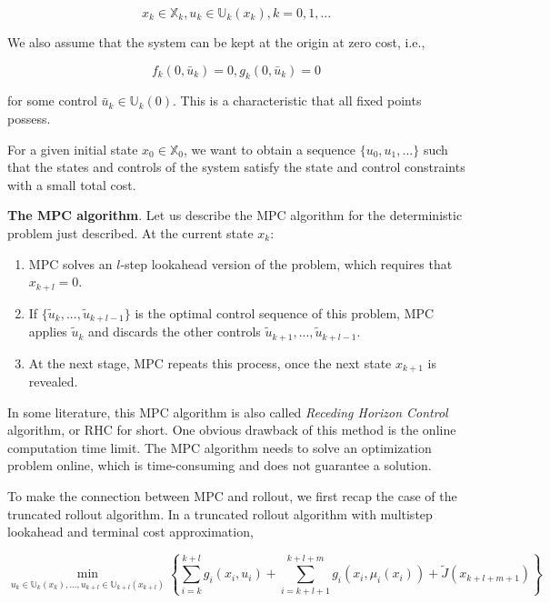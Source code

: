 \documentclass[
]{book}
\theoremstyle{definition}
\theoremstyle{definition}
\theoremstyle{definition}
\theoremstyle{definition}
\theoremstyle{remark}
\begin{document}
\begin{equation}
x_k \in \mathbb X_k, u_k \in \mathbb U_k(x_k), k = 0,1,...
\end{equation}

We also assume that the system can be kept at the origin at zero cost, i.e.,

\begin{equation}
f_k(0,\bar u_k)=0,g_k(0,\bar u_k)=0 
\end{equation}

for some control \(\bar u_k \in \mathbb U_k(0)\). This is a characteristic that all fixed points possess.

For a given initial state \(x_0 \in \mathbb X_0\), we want to obtain a sequence \(\{u_0,u_1,...\}\) such that the states and controls of the system satisfy the state and control constraints with a small total cost.

\textbf{The MPC algorithm}. Let us describe the MPC algorithm for the deterministic problem just described. At the current state \(x_k\):

\begin{enumerate}
\def\labelenumi{\arabic{enumi}.}
\item
  MPC solves an \(l\)-step lookahead version of the problem, which requires that \(x_{k+l}=0\).
\item
  If \(\{\tilde u_k, ..., \tilde u_{k+l-1}\}\) is the optimal control sequence of this problem, MPC applies \(\tilde u_k\) and discards the other controls \(\tilde u_{k+1}, ..., \tilde u_{k+l-1}\).
\item
  At the next stage, MPC repeats this process, once the next state \(x_{k+1}\) is revealed.
\end{enumerate}

In some literature, this MPC algorithm is also called \emph{Receding Horizon Control} algorithm, or RHC for short. One obvious drawback of this method is the online computation time limit. The MPC algorithm needs to solve an optimization problem online, which is time-consuming and does not guarantee a solution.

To make the connection between MPC and rollout, we first recap the case of the truncated rollout algorithm. In a truncated rollout algorithm with multistep lookahead and terminal cost approximation,

\begin{equation}
\min_{u_k \in \mathbb U_k(x_k), ..., u_{k+l} \in \mathbb U_{k+l}(x_{k+l})} \left\{\sum_{i=k}^{k+l} g_i(x_i, u_i) + \sum_{i=k+l+1}^{k+l+m} g_i(x_i,\mu_i(x_i)) + \tilde J (x_{k+l+m+1}) \right\}
\end{equation}
\end{document}
